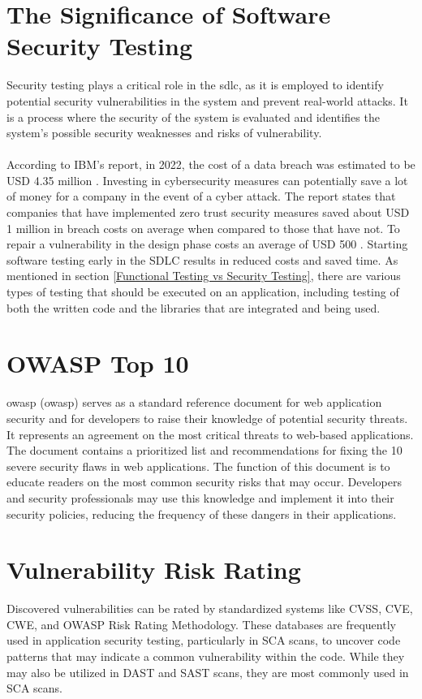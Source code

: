 \section{The Significance of Software Security Testing}
Security testing plays a critical role in the \acrlong{sdlc}, as it is employed to identify potential security vulnerabilities in the system and prevent real-world attacks. It is a process where the security of the system is evaluated and identifies the system's possible security weaknesses and risks of vulnerability. \cite{whysectest}
\\~\\
According to IBM's report, in 2022, the cost of a data breach was estimated to be USD 4.35 million \cite{databreach}. Investing in cybersecurity measures can potentially save a lot of money for a company in the event of a cyber attack. The report states that companies that have implemented zero trust security measures saved about USD 1 million in breach costs on average when compared to those that have not. To repair a vulnerability in the design phase costs an average of USD 500 \cite{fixvulnerability}. Starting software testing early in the SDLC results in reduced costs and saved time. As mentioned in section \ref{Functional Testing vs Security Testing}, there are various types of testing that should be executed on an application, including testing of both the written code and the libraries that are integrated and being used.


\section{OWASP Top 10}
\acrlong{owasp} (\acrshort{owasp}) serves as a standard reference document for web application security and for developers to raise their knowledge of potential security threats. It represents an agreement on the most critical threats to web-based applications. The document contains a prioritized list and recommendations for fixing the 10 severe security flaws in web applications. The function of this document is to educate readers on the most common security risks that may occur. Developers and security professionals may use this knowledge and implement it into their security policies, reducing the frequency of these dangers in their applications. 


\section{Vulnerability Risk Rating}
Discovered vulnerabilities can be rated by standardized systems like CVSS, CVE, CWE, and OWASP Risk Rating Methodology. These databases are frequently used in application security testing, particularly in SCA scans, to uncover code patterns that may indicate a common vulnerability within the code. While they may also be utilized in DAST and SAST scans, they are most commonly used in SCA scans. 

